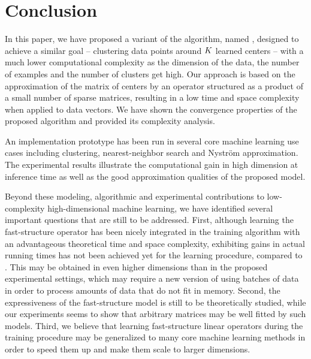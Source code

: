\section{Conclusion}
\label{sec:conclusion}

In this paper, we have proposed a variant of the \kmeans algorithm, named \qkmeans, designed to achieve a similar goal -- clustering data points around $K$ learned centers -- with a much lower computational complexity as the dimension of the data, the number of examples and the number of clusters get high. 
Our approach is based on the approximation of the matrix of centers by an operator structured as a product of a small number of sparse matrices, resulting in a low time and space complexity when applied to data vectors.
We have shown the convergence properties of the proposed algorithm and provided its complexity analysis.

An implementation prototype has been run in several core machine learning use cases including clustering, nearest-neighbor search and Nystr\"om approximation. 
The experimental results illustrate the computational gain in high dimension at inference time as well as the good approximation qualities of the proposed model. 

Beyond these modeling, algorithmic and experimental contributions to low-complexity high-dimensional machine learning, we have identified several important questions that are still to be addressed.
First, although learning the fast-structure operator has been nicely integrated in the training algorithm with an advantageous theoretical time and space complexity, exhibiting gains in actual running times has not been achieved yet for the \qkmeans learning procedure, compared to \kmeans.
This may be obtained in even higher dimensions than in the proposed experimental settings, which may require a new version of \qkmeans using batches of data in order to process amounts of data that do not fit in memory.
Second, the expressiveness of the fast-structure model is still to be theoretically studied, while our experiments seems to show that arbitrary matrices may be well fitted by such models.
Third, we believe that learning fast-structure linear operators during the training procedure may be generalized to many core machine learning methods in order to speed them up and make them scale to larger dimensions.

